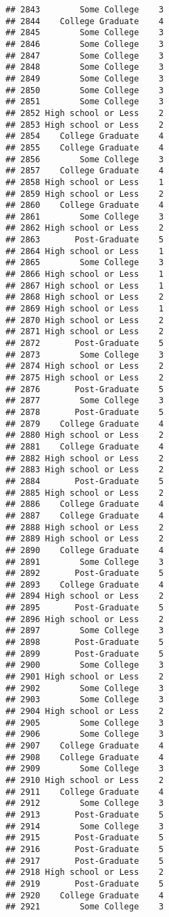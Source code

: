 \documentclass[
]{article}
\begin{document}
\begin{verbatim}
## 2843        Some College    3
## 2844    College Graduate    4
## 2845        Some College    3
## 2846        Some College    3
## 2847        Some College    3
## 2848        Some College    3
## 2849        Some College    3
## 2850        Some College    3
## 2851        Some College    3
## 2852 High school or Less    2
## 2853 High school or Less    2
## 2854    College Graduate    4
## 2855    College Graduate    4
## 2856        Some College    3
## 2857    College Graduate    4
## 2858 High school or Less    1
## 2859 High school or Less    2
## 2860    College Graduate    4
## 2861        Some College    3
## 2862 High school or Less    2
## 2863       Post-Graduate    5
## 2864 High school or Less    1
## 2865        Some College    3
## 2866 High school or Less    1
## 2867 High school or Less    1
## 2868 High school or Less    2
## 2869 High school or Less    1
## 2870 High school or Less    2
## 2871 High school or Less    2
## 2872       Post-Graduate    5
## 2873        Some College    3
## 2874 High school or Less    2
## 2875 High school or Less    2
## 2876       Post-Graduate    5
## 2877        Some College    3
## 2878       Post-Graduate    5
## 2879    College Graduate    4
## 2880 High school or Less    2
## 2881    College Graduate    4
## 2882 High school or Less    2
## 2883 High school or Less    2
## 2884       Post-Graduate    5
## 2885 High school or Less    2
## 2886    College Graduate    4
## 2887    College Graduate    4
## 2888 High school or Less    2
## 2889 High school or Less    2
## 2890    College Graduate    4
## 2891        Some College    3
## 2892       Post-Graduate    5
## 2893    College Graduate    4
## 2894 High school or Less    2
## 2895       Post-Graduate    5
## 2896 High school or Less    2
## 2897        Some College    3
## 2898       Post-Graduate    5
## 2899       Post-Graduate    5
## 2900        Some College    3
## 2901 High school or Less    2
## 2902        Some College    3
## 2903        Some College    3
## 2904 High school or Less    2
## 2905        Some College    3
## 2906        Some College    3
## 2907    College Graduate    4
## 2908    College Graduate    4
## 2909        Some College    3
## 2910 High school or Less    2
## 2911    College Graduate    4
## 2912        Some College    3
## 2913       Post-Graduate    5
## 2914        Some College    3
## 2915       Post-Graduate    5
## 2916       Post-Graduate    5
## 2917       Post-Graduate    5
## 2918 High school or Less    2
## 2919       Post-Graduate    5
## 2920    College Graduate    4
## 2921        Some College    3

\end{verbatim}
\end{document}

